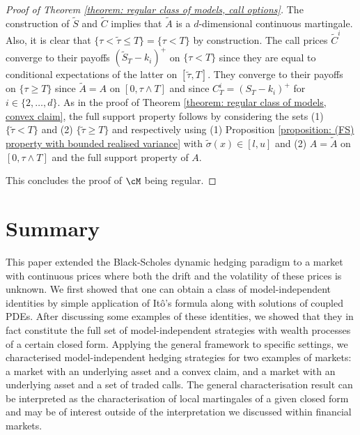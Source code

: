 \documentclass[11pt]{article}
\begin{document}
\begin{proof}[Proof of Theorem \ref{theorem: regular class of models, call options}]
The construction of $\widetilde{S}$ and $\widetilde{C}$ implies that $\widetilde{A}$ is a $d$-dimensional continuous martingale. Also, it is clear that $\{\tau < \widetilde{\tau} \leq T \} = \{ \tau < T \}$ by construction. The call prices $\widetilde{C}^i$ converge to their payoffs $(\widetilde{S}_T - k_i)^+$ on $\{ \tau < T \}$ since they are equal to conditional expectations of the latter on $[\widetilde{\tau},T]$. They converge to their payoffs on $\{ \tau \geq T \}$ since $\widetilde{A} = A$ on $[0,\tau \wedge T]$ and since $C^i_T = (S_T - k_i)^+$ for $i \in \{2,\ldots,d\}$. As in the proof of Theorem \ref{theorem: regular class of models, convex claim}, the full support property follows by considering the sets (1) $\{ \widetilde{\tau} < T \}$ and (2) $\{\widetilde{\tau} \geq T\}$ and respectively using (1) Proposition \ref{proposition: (FS) property with bounded realised variance} with $\widetilde{\sigma}(x) \in [l,u]$ and (2) $A = \widetilde{A}$ on $[0,\tau \wedge T]$ and the full support property of $A$.

This concludes the proof of $\cM$ being regular.

\end{proof}

\section{Summary}
\label{section: conclusion}

This paper extended the Black-Scholes dynamic hedging paradigm to a market with continuous prices where both the drift and the volatility of these prices is unknown. We first showed that one can obtain a class of model-independent identities by simple application of It\^o's formula along with solutions of coupled PDEs. After discussing some examples of these identities, we showed that they in fact constitute the full set of model-independent strategies with wealth processes of a certain closed form. Applying the general framework to specific settings, we characterised model-independent hedging strategies for two examples of markets: a market with an underlying asset and a convex claim, and a market with an underlying asset and a set of traded calls. The general characterisation result can be interpreted as the characterisation of local martingales of a given closed form and may be of interest outside of the interpretation we discussed within financial markets.

\appendix

\newpage
\end{document}
